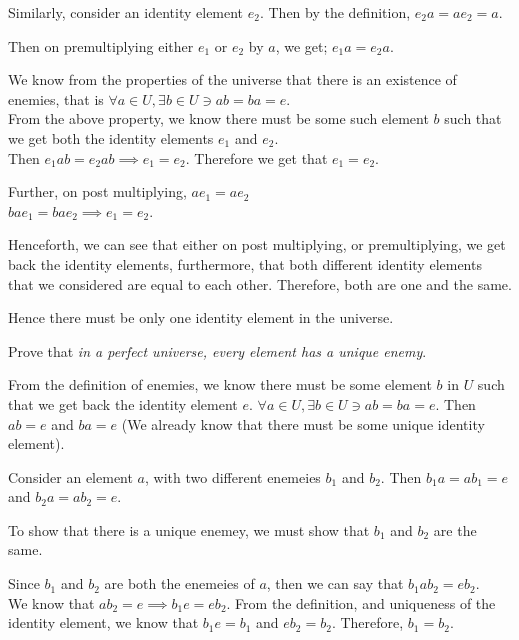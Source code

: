 \documentclass[a4paper]{exam}
\begin{document}
\begin{questions}
\begin{parts}
\begin{solution}
      Similarly, consider an identity element $e_2$. Then by the definition, $ e_2a = ae_2 = a $.

      Then on premultiplying either $ e_1 $ or $ e_2 $ by $a$, we get; $ e_1 a = e_2 a $. 

      We know from the properties of the universe that there is an existence of enemies, that is $ \forall a \in U, \exists b \in U \ni ab = ba = e $. \\ 
      From the above property, we know there must be some such element $b$ such that we get both the identity elements $e_1$ and $e_2$. \\ 
      Then $ e_1ab = e_2ab \implies e_1 = e_2 $. Therefore we get that $ e_1 = e_2 $. 

      Further, on post multiplying, $ ae_1 = ae_2 $ \\ 
      $ bae_1 = bae_2 \implies e_1 = e_2 $.

      Henceforth, we can see that either on post multiplying, or premultiplying, we get back the identity elements, furthermore, that both different identity elements that we considered are equal to each other. Therefore, both are one and the same. 

      Hence there must be only one identity element in the universe.
    \end{solution}
  \item Prove that \textit{in a perfect universe, every element has a unique enemy}.
    \begin{solution}

      From the definition of enemies, we know there must be some element $b$ in $U$ such that we get back the identity element $e$. $ \forall a \in U, \exists b \in U \ni ab = ba = e $. Then $ ab = e $ and $ ba = e $
      (We already know that there must be some unique identity element).

      Consider an element $a$, with two different enemeies $ b_1 $ and $b_2$. Then $ b_1 a = a b_1 = e $ and $ b_2 a = a b_2 = e $.

      To show that there is a unique enemey, we must show that $ b_1 $ and $ b_2 $ are the same. 

      Since $ b_1 $ and $ b_2 $ are both the enemeies of $a$, then we can say that $ b_1 a b_2 = e b_2 $. \\ We know that $ ab_2 = e \implies b_1 e = e b_2$. From the definition, and uniqueness of the identity element, we know that $ b_1 e = b_1 $ and $ eb_2 = b_2 $. Therefore, $ b_1 = b_2 $. 


\end{solution}
\end{parts}
\end{questions}
\end{document}
